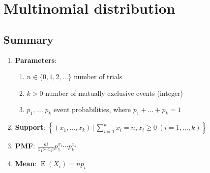 \section{Multinomial distribution}






\subsection{Summary}

\begin{enumerate}

    \item \textbf{Parameters}:
    \begin{enumerate}
        \item ${\displaystyle n\in \{0,1,2,\ldots \}}$ number of trials
        \hfill \cite{wiki/Multinomial_distribution}

        \item ${\displaystyle k>0}$ number of mutually exclusive events (integer)
        \hfill \cite{wiki/Multinomial_distribution}

        \item ${\displaystyle p_{1},\ldots ,p_{k}}$ event probabilities, where ${\displaystyle p_{1}+\dots +p_{k}=1}$
        \hfill \cite{wiki/Multinomial_distribution}
    \end{enumerate}
    \hfill \cite{wiki/Multinomial_distribution}

    \item \textbf{Support}:
    $  {\displaystyle \left\lbrace (x_{1},\dots ,x_{k})\,{\Big \vert }\,\sum _{i=1}^{k}x_{i}=n,x_{i}\geq 0\ (i=1,\dots ,k)\right\rbrace } $
    \hfill \cite{wiki/Multinomial_distribution}

    \item \textbf{PMF}:
    $  {\displaystyle {\frac {n!}{x_{1}!\cdots x_{k}!}}p_{1}^{x_{1}}\cdots p_{k}^{x_{k}}} $
    \hfill \cite{wiki/Multinomial_distribution}


    \item \textbf{Mean}:
    $  {\displaystyle \operatorname {E} (X_{i})=np_{i}} $
    \hfill \cite{wiki/Multinomial_distribution}


\end{enumerate}
